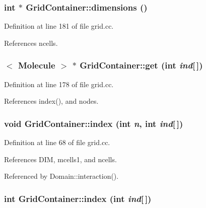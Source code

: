 \hypertarget{namespaceGridContainer_2152d021e14ed0184e7fe304026bcbb0}{
\subsubsection[{dimensions}]{\setlength{\rightskip}{0pt plus 5cm}int $\ast$ GridContainer::dimensions ()}}
\label{namespaceGridContainer_2152d021e14ed0184e7fe304026bcbb0}




Definition at line 181 of file grid.cc.

References ncells.\hypertarget{namespaceGridContainer_a7d85bbf45b4a2553d49cc6e020eacbf}{
\subsubsection[{get}]{$<$ {\bf Molecule} $>$ $\ast$ GridContainer::get (int {\em ind}\mbox{[}$\,$\mbox{]})}}
\label{namespaceGridContainer_a7d85bbf45b4a2553d49cc6e020eacbf}




Definition at line 178 of file grid.cc.

References index(), and nodes.\hypertarget{namespaceGridContainer_4a68b0ee2452c91a40d267ddc754f5a6}{
\subsubsection[{index}]{\setlength{\rightskip}{0pt plus 5cm}void GridContainer::index (int {\em n}, \/  int {\em ind}\mbox{[}$\,$\mbox{]})}}
\label{namespaceGridContainer_4a68b0ee2452c91a40d267ddc754f5a6}




Definition at line 68 of file grid.cc.

References DIM, mcells1, and ncells.

Referenced by Domain::interaction().\hypertarget{namespaceGridContainer_7d5bce24ba1e580809a8b7028255185c}{
\subsubsection[{index}]{\setlength{\rightskip}{0pt plus 5cm}int GridContainer::index (int {\em ind}\mbox{[}$\,$\mbox{]})}}
\label{namespaceGridContainer_7d5bce24ba1e580809a8b7028255185c}




